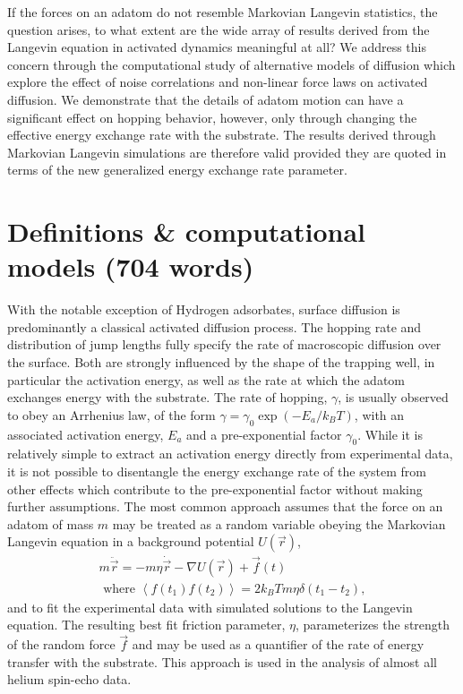 \documentclass[7pt]{article}
\begin{document}
If the forces on an adatom do not resemble Markovian Langevin statistics, the question arises, to what extent are the wide array of results derived from the Langevin equation in activated dynamics meaningful at all? We address this concern through the computational study of alternative models of diffusion which explore the effect of noise correlations and non-linear force laws on activated diffusion. We demonstrate that the details of adatom motion can have a significant effect on hopping behavior, however, only through changing the effective energy exchange rate with the substrate. The results derived through Markovian Langevin simulations are therefore valid provided they are quoted in terms of the new generalized energy exchange rate parameter. 

\section*{Definitions \& computational models (704 words)}

With the notable exception of Hydrogen adsorbates\cite{McIntosh2013}, surface diffusion is predominantly a classical activated diffusion process. The hopping rate and distribution of jump lengths fully specify the rate of macroscopic diffusion over the surface. Both are strongly influenced by the shape of the trapping well, in particular the activation energy, as well as the rate at which the adatom exchanges energy with the substrate. The rate of hopping, $\gamma$, is usually observed to obey an Arrhenius law, of the form $\gamma = \gamma_0 \exp\left(-E_a/k_BT\right)$, with an associated activation energy, $E_a$ and a pre-exponential factor $\gamma_0$. While it is relatively simple to extract an activation energy directly from experimental data\cite{Diamant,Alexandrowicz2006}, it is not possible to disentangle the energy exchange rate of the system from other effects which contribute to the pre-exponential factor without making further assumptions. The most common approach assumes that the force on an adatom of mass $m$ may be treated as a random variable obeying the Markovian Langevin equation in a background potential $U(\vec{r})$,
\begin{equation}
\begin{gathered}
	m\ddot{\vec{r}}=-m\eta\dot{\vec{r}}-\nabla U(\vec{r})+\vec{f}(t) \\ 
	\text{ where } \left<f(t_1)f(t_2)\right>=2k_BTm\eta\delta(t_1-t_2),
	\label{eq:langevin}
\end{gathered}
\end{equation}
and to fit the experimental data with simulated solutions to the Langevin equation. The resulting best fit friction parameter, $\eta$, parameterizes the strength of the random force $\vec{f}$ and may be used as a quantifier of the rate of energy transfer with the substrate. This approach is used in the analysis of almost all helium spin-echo data\cite{Jardine200911, Jardine200906}. 
\end{document}
